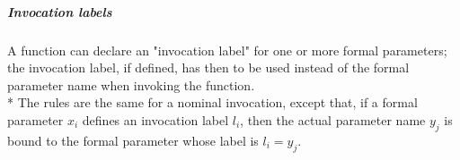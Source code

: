 \subparagraph{Invocation labels} A function can declare an "invocation label"
for one or more formal parameters; the invocation label, if defined, has then
to be used instead of the formal parameter name when invoking the function.\\*
The rules are the same for a nominal invocation, except that, if a formal
parameter $x_i$ defines an invocation label $l_i$, then the actual parameter
name $y_j$ is bound to the formal parameter whose label is $l_i=y_j$.





